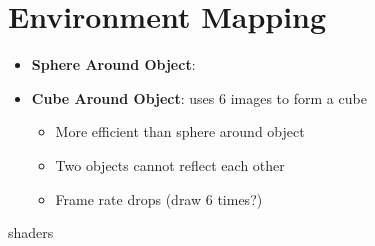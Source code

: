 \section{Environment Mapping}

  \begin{itemize}
    \item \textbf{Sphere Around Object}:
    \item \textbf{Cube Around Object}: uses 6 images to form a cube
    \begin{itemize}
      \item More efficient than sphere around object
      \item Two objects cannot reflect each other
      \item Frame rate drops (draw 6 times?)
    \end{itemize}
  \end{itemize}

{shaders}
